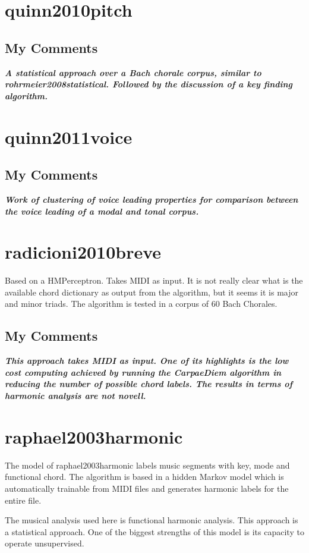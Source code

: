 \section{quinn2010pitch }
  \subsection{My Comments}
    \emph{\textbf{
      A statistical approach over a Bach chorale corpus, similar to rohrmeier2008statistical. Followed by the discussion of a key finding algorithm.
    }}
\section{quinn2011voice }
  \subsection{My Comments}
        \emph{\textbf{
      Work of clustering of voice leading properties for comparison between the voice leading of a modal and tonal corpus.
    }}
\section{radicioni2010breve }
  Based on a HMPerceptron. Takes MIDI as input. It is not really clear what is the available chord dictionary as output from the algorithm, but it seems it is major and minor triads. The algorithm is tested in a corpus of 60 Bach Chorales.
  \subsection{My Comments}
    \emph{\textbf{
      This approach takes MIDI as input. One of its highlights is the low cost computing achieved by running the CarpaeDiem algorithm in reducing the number of possible chord labels. The results in terms of harmonic analysis are not novell.
    }}

\section{raphael2003harmonic }
  The model of raphael2003harmonic labels music segments with key, mode and functional chord. The algorithm is based in a hidden Markov model which is automatically trainable from MIDI files and generates harmonic labels for the entire file.

  The musical analysis used here is functional harmonic analysis. This approach is a statistical approach. One of the biggest strengths of this model is its capacity to operate unsupervised.

